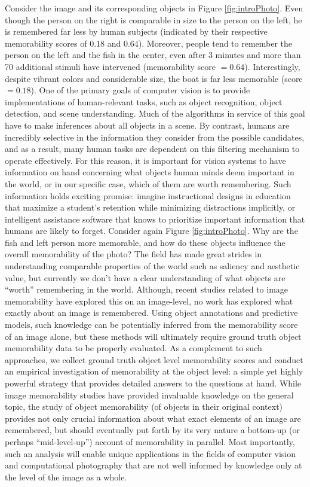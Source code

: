 Consider the image and its corresponding objects in Figure \ref{fig:introPhoto}. Even though the person on the right is comparable in size to the person on the left, he is remembered far less by human subjects (indicated by their respective memorability scores of $0.18$ and $0.64$). Moreover, people tend to remember the person on the left and the fish in the center, even after $3$ minutes and more than 70 additional stimuli have intervened (memorability score $= 0.64$). Interestingly, despite vibrant colors and considerable size, the boat is far less memorable (score $= 0.18$). One of the primary goals of computer vision is to provide implementations of human-relevant tasks, such as object recognition, object detection, and scene understanding. Much of the algorithms in service of this goal have to make inferences about all objects in a scene. By contrast, humans are incredibly selective in the information they consider from the possible candidates, and as a result, many human tasks are dependent on this filtering mechanism to operate effectively. For this reason, it is important for vision systems to have information on hand concerning what objects human minds deem important in the world, or in our specific case, which of them are worth remembering. Such information holds exciting promise: imagine instructional designs in education that maximize a student's retention while minimizing distractions implicitly, or intelligent assistance software that knows to prioritize important information that humans are likely to forget. Consider again Figure \ref{fig:introPhoto}. Why are the fish and left person more memorable, and how do these objects influence the overall memorability of the photo? The field has made great strides in understanding comparable properties of the world such as saliency and aesthetic value, but currently we don’t have a clear understanding of what objects are “worth” remembering in the world. Although, recent studies related to image memorability have explored this on an image-level, no work has explored what exactly about an image is remembered. Using object annotations and predictive models, such knowledge can be potentially inferred from the memorability score of an image alone, but these methods will ultimately require ground truth object memorability data to be properly evaluated. As a complement to such approaches, we collect ground truth object level memorability scores and conduct an empirical investigation of  memorability at the object level: a simple yet highly powerful strategy that provides detailed answers to the questions at hand. While image memorability studies have provided invaluable knowledge on the general topic, the study of object memorability (of objects in their original context) provides not only crucial information about what exact elements of an image are remembered, but should eventually put forth by its very nature a bottom-up (or perhaps “mid-level-up”) account of memorability in parallel. Most importantly, such an analysis will enable unique applications in the fields of computer vision and computational photography that are not well informed by knowledge only at the level of the image as a whole.

